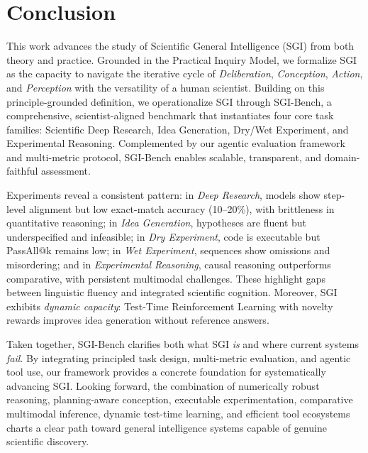\section{Conclusion}

This work advances the study of Scientific General Intelligence (SGI) from both theory and practice. Grounded in the Practical Inquiry Model, we formalize SGI as the capacity to navigate the iterative cycle of \emph{Deliberation}, \emph{Conception}, \emph{Action}, and \emph{Perception} with the versatility of a human scientist. Building on this principle-grounded definition, we operationalize SGI through SGI-Bench, a comprehensive, scientist-aligned benchmark that instantiates four core task families: Scientific Deep Research, Idea Generation, Dry/Wet Experiment, and Experimental Reasoning. Complemented by our agentic evaluation framework and multi-metric protocol, SGI-Bench enables scalable, transparent, and domain-faithful assessment.

Experiments reveal a consistent pattern: in \emph{Deep Research}, models show step-level alignment but low exact-match accuracy (10--20\%), with brittleness in quantitative reasoning; in \emph{Idea Generation}, hypotheses are fluent but underspecified and infeasible; in \emph{Dry Experiment}, code is executable but PassAll@k remains low; in \emph{Wet Experiment}, sequences show omissions and misordering; and in \emph{Experimental Reasoning}, causal reasoning outperforms comparative, with persistent multimodal challenges. These highlight gaps between linguistic fluency and integrated scientific cognition. Moreover, SGI exhibits \emph{dynamic capacity}: Test-Time Reinforcement Learning with novelty rewards improves idea generation without reference answers.

Taken together, SGI-Bench clarifies both what SGI \emph{is} and where current systems \emph{fail}. By integrating principled task design, multi-metric evaluation, and agentic tool use, our framework provides a concrete foundation for systematically advancing SGI. Looking forward, the combination of numerically robust reasoning, planning-aware conception, executable experimentation, comparative multimodal inference, dynamic test-time learning, and efficient tool ecosystems charts a clear path toward general intelligence systems capable of genuine scientific discovery.
